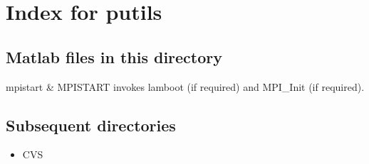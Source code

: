 \section{Index for {\sc putils}}

\subsection{Matlab files in this directory}

\begin{tabular}

mpistart & MPISTART invokes lamboot (if required) and MPI_Init (if required).  \\
\end{tabular}


\subsection{Subsequent directories}

\begin{itemize}


\item CVS
\end{itemize}